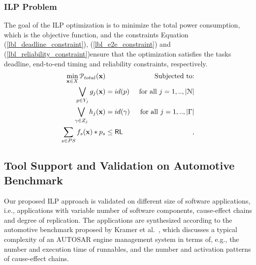 \subsubsection{ILP Problem}
The goal of the ILP optimization is to minimize the total power consumption, which is the objective function, and the constraints Equation (\ref{lbl_deadline_constraint}), (\ref{lbl_e2e_constraint}) and (\ref{lbl_reliability_constraint})ensure that the optimization satisfies the tasks deadline, end-to-end timing and reliability constraints, respectively.
\begin{align}
\label{eqn_const_func}
\min_{\x\in X} \mathcal{P}_{total}(\x) && \text{ Subjected to:}\\
\label{lbl_deadline_constraint} 
\bigvee\limits_{p\in Y_j} g_j (\x) &= id(p)& \mbox{ for all } j=1,..,|\mathcal{N}|\\ 
\label{lbl_e2e_constraint}
\bigvee\limits_{\gamma\in Z_j} h_j (\x) &= id(\gamma) & \mbox{ for all } j=1,..,|\Gamma|\\ 
\label{lbl_reliability_constraint}
\sum_{s\in PS}f_s(\x)*p_s &\leq \RL&,
\end{align}

\subsection{Tool Support and Validation on Automotive Benchmark}
Our proposed ILP approach is validated on different size of software applications, i.e., applications with variable number of software components, cause-effect chains and degree of replication. The applications are synthesized according to the automotive benchmark proposed by Kramer et al.~\cite{Kramer2015RealFree}, which discusses a typical complexity of an AUTOSAR engine management system in terms of, e.g., the number and execution time of runnables, and the number and activation patterns of cause-effect chains. 

